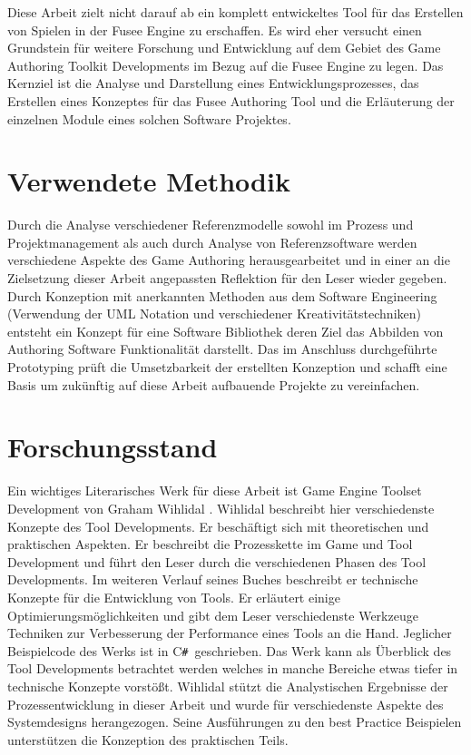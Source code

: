 \documentclass[pagesize, paper=a4, fontsize=12pt, titlepage=true, headings=small, headnosepline, abstractoff, liststotoc, nochapterprefix, plainheadsepline, twoside]{scrreprt}
\newcommand{\CSS}{C\texttt{\# }}
\begin{document}
Diese Arbeit zielt nicht darauf ab ein komplett entwickeltes Tool für das Erstellen von Spielen in der Fusee Engine zu erschaffen. Es wird eher versucht einen Grundstein für weitere Forschung und Entwicklung auf dem Gebiet des Game Authoring Toolkit Developments im Bezug auf die Fusee Engine zu legen. Das Kernziel ist die Analyse und Darstellung eines Entwicklungsprozesses, das Erstellen eines Konzeptes für das Fusee Authoring Tool und die Erläuterung der einzelnen Module eines solchen Software Projektes.

\section{Verwendete Methodik}
Durch die Analyse verschiedener Referenzmodelle sowohl im Prozess und Projektmanagement als auch durch Analyse von Referenzsoftware werden verschiedene Aspekte des Game Authoring herausgearbeitet und in einer an die Zielsetzung dieser Arbeit angepassten Reflektion für den Leser wieder gegeben.
Durch Konzeption mit anerkannten Methoden aus dem Software Engineering (Verwendung der UML Notation und verschiedener Kreativitätstechniken) entsteht ein Konzept für eine Software Bibliothek deren Ziel das Abbilden von Authoring Software Funktionalität darstellt.
Das im Anschluss durchgeführte Prototyping prüft die Umsetzbarkeit der erstellten Konzeption und schafft eine Basis um zukünftig auf diese Arbeit aufbauende Projekte zu vereinfachen.

\section{Forschungsstand}
Ein wichtiges Literarisches Werk für diese Arbeit ist Game Engine Toolset Development von Graham Wihlidal \parencite{Wihlidal2006}.  Wihlidal beschreibt hier verschiedenste Konzepte des Tool Developments. Er beschäftigt sich mit theoretischen und praktischen Aspekten. Er beschreibt die Prozesskette im Game und Tool Development und führt den Leser durch die verschiedenen Phasen des Tool Developments. Im weiteren Verlauf seines Buches beschreibt er technische Konzepte für die Entwicklung von Tools. Er erläutert einige Optimierungsmöglichkeiten und gibt dem Leser verschiedenste Werkzeuge Techniken zur Verbesserung der Performance eines Tools an die Hand. Jeglicher Beispielcode des Werks ist in \CSS geschrieben. Das Werk kann als Überblick des Tool Developments betrachtet werden welches in manche Bereiche etwas tiefer in technische Konzepte vorstößt. Wihlidal stützt die Analystischen Ergebnisse der Prozessentwicklung in dieser Arbeit und wurde für verschiedenste Aspekte des Systemdesigns herangezogen. Seine Ausführungen zu den best Practice Beispielen unterstützen die Konzeption des praktischen Teils.
\end{document}
